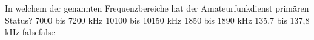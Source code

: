     {In welchem der genannten Frequenzbereiche hat der Amateurfunkdienst primären Status?}
    {7000 bis 7200 kHz}
    {10100 bis 10150 kHz}
    {1850 bis 1890 kHz}
    {135,7 bis 137,8 kHz}
    {false}{false}